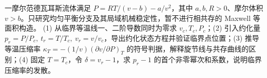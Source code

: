 一摩尔范德瓦耳斯流体满足 \(P=RT/(v-b)-a/v^2\)，其中 \(a,b,R>0\)、摩尔体积 \(v>b\)。只研究均匀平衡分支及其局域机械稳定性，暂不进行相共存的 Maxwell 等面积构造。
(1) 从临界等温线一、二阶导数同时为零求 \(v_c,T_c,P_c\)；(2) 引入约化量 \(p_r=P/P_c,\ t_r=T/T_c,\ v_r=v/v_c\)，导出约化状态方程并验证临界点位置；(3) 推导等温压缩率 \(\kappa_T=-(1/v)(\partial v/\partial P)_T\) 的符号判据，解释旋节线与共存曲线的区别；(4) 固定 \(T=T_c\)，令 \(\delta=v_r-1\)，求 \(p_r-1\) 的首个非零幂次和系数，说明临界压缩率的发散。
